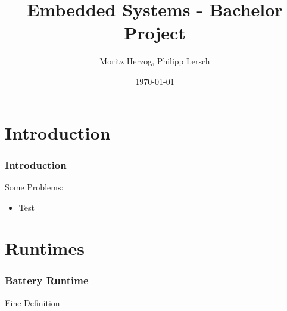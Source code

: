 \documentclass{beamer}
\title{Embedded Systems - Bachelor Project}
\author{Moritz Herzog, Philipp Lersch}
\date{\today}
\begin{document}
\maketitle
\frame{\tableofcontents}

\section{Introduction}
\begin{frame}
    \frametitle{Introduction}
    Some Problems:
    \begin{itemize}
        \item Test
    \end{itemize}
\end{frame}
\section{Runtimes}
\begin{frame} %
  \frametitle{Battery Runtime} %
  \begin{Definition} %
    Eine Definition
  \end{Definition}
\end{frame}
\end{document}
